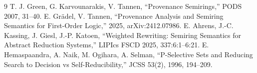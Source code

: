 \documentclass[11pt]{article}
\begin{document}
\begin{thebibliography}{9}
 T. J. Green, G. Karvounarakis, V. Tannen, ``Provenance Semirings,'' PODS 2007, 31--40.
 E. Gr\"adel, V. Tannen, ``Provenance Analysis and Semiring Semantics for First-Order Logic,'' 2025, arXiv:2412.07986.
 E. Ahrens, J.-C. Kassing, J. Giesl, J.-P. Katoen, ``Weighted Rewriting: Semiring Semantics for Abstract Reduction Systems,'' LIPIcs FSCD 2025, 337:6:1--6:21.
 E. Hemaspaandra, A. Naik, M. Ogihara, A. Selman, ``P-Selective Sets and Reducing Search to Decision vs Self-Reducibility,'' JCSS 53(2), 1996, 194--209.
\end{thebibliography}
\end{document}
